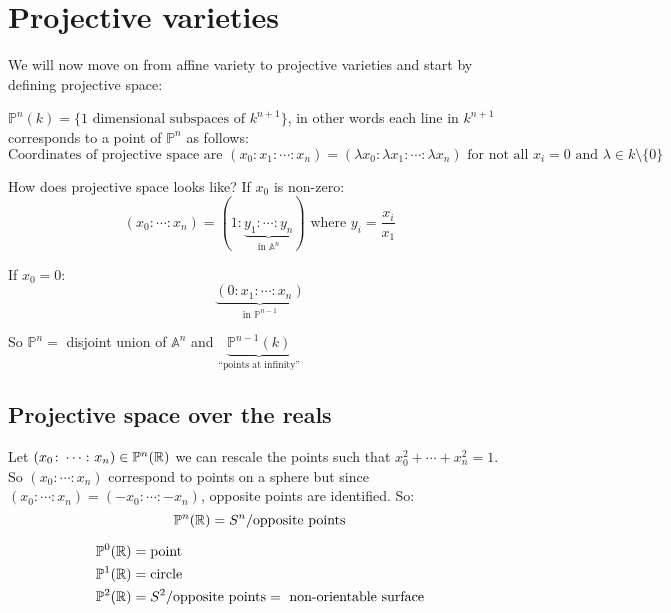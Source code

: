 \section{Projective varieties}

We will now move on from affine variety to projective varieties and start by defining projective space:\begin{definition}
    $\mathbb{P}^n(k) = \{\text{1 dimensional subspaces of }k^{n+1}\}$, in other words each line in $k^{n+1}$ corresponds to a point of $\mathbb{P}^n$ as follows:\begin{equation*}
        \text{Coordinates of projective space are } (x_0\colon x_1\colon \cdots\colon x_n) = (\lambda x_0\colon \lambda x_1\colon \cdots\colon \lambda x_n) \text{ for not all }x_i = 0\text{ and }\lambda\in k\setminus\{0\} 
    \end{equation*}
\end{definition} 

How does projective space looks like? If $x_0$ is non-zero:\begin{equation*}
    (x_0\colon \cdots \colon x_n) = (1\colon \underbrace{y_1\colon \cdots \colon y_n}_{\text{in }\mathbb{A}^n}) \text{ where } y_i = \frac{x_i}{x_1}
\end{equation*}

If $x_0 = 0$:\begin{equation*}
    \underbrace{(0\colon x_1\colon \cdots\colon x_n)}_{\text{in }\mathbb{P}^{n-1}}
\end{equation*}

So $\mathbb{P}^n = $ disjoint union of $\mathbb{A}^n$ and $\underbrace{\mathbb{P}^{n-1}(k)}_{\text{``points at infinity''}}$

\subsection{Projective space over the reals}

Let $(x_0\colon\cdots\colon x_n)\in \mathbb{P}^n(\mathbb{R})$ we can rescale the points such that $x_0^2+\cdots+x_n^2 = 1$. So $(x_0\colon\cdots\colon x_n)$ correspond to points on a sphere but since $(x_0\colon\cdots\colon x_n) = (-x_0\colon\cdots\colon -x_n)$, opposite points are identified. So:\[\mathbb{P}^n(\mathbb{R}) = S^n/\text{opposite points}\]

\begin{example}
\begin{align*}
    \mathbb{P}^0(\mathbb{R}) &= \text{point}\\
    \mathbb{P}^1(\mathbb{R}) &= \text{circle}\\
    \mathbb{P}^2(\mathbb{R}) &= S^2/\text{opposite points} = \text{ non-orientable surface}
\end{align*}
\end{example}

